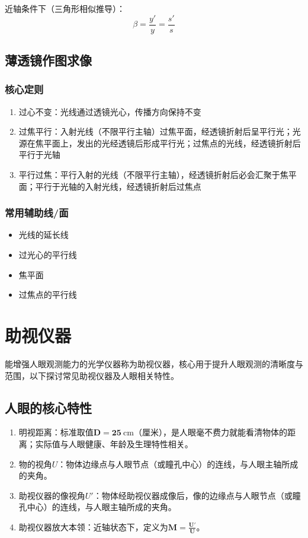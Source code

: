 \documentclass{article}
\begin{document}
	近轴条件下（三角形相似推导）：
	\[
	\beta=\frac{y'}{y}=\frac{s'}{s}
	\]
	
	\subsection{薄透镜作图求像}
	\subsubsection{核心定则}
	\begin{enumerate}[label=\arabic*., leftmargin=2em]
		\item 过心不变：光线通过透镜光心，传播方向保持不变
		\item 过焦平行：入射光线（不限平行主轴）过焦平面，经透镜折射后呈平行光；光源在焦平面上，发出的光经透镜后形成平行光；过焦点的光线，经透镜折射后平行于光轴
		\item 平行过焦：平行入射的光线（不限平行主轴），经透镜折射后必会汇聚于焦平面；平行于光轴的入射光线，经透镜折射后过焦点
	\end{enumerate}
	
	\subsubsection{常用辅助线/面}
	\begin{itemize}[leftmargin=2em, itemsep=0.3em]
		\item 光线的延长线
		\item 过光心的平行线
		\item 焦平面
		\item 过焦点的平行线
	\end{itemize}
	
	
	
	\section{助视仪器}
	能增强人眼观测能力的光学仪器称为助视仪器，核心用于提升人眼观测的清晰度与范围，以下探讨常见助视仪器及人眼相关特性。
	
	\subsection{人眼的核心特性}
	\begin{enumerate}[label=\arabic*., leftmargin=2em, itemsep=0.5em]
		\item 明视距离：标准取值$\boldsymbol{D=25\ \mathrm{cm}}$（厘米），是人眼毫不费力就能看清物体的距离；实际值与人眼健康、年龄及生理特性相关。
		\item 物的视角$U$：物体边缘点与人眼节点（或瞳孔中心）的连线，与人眼主轴所成的夹角。
		\item 助视仪器的像视角$U'$：物体经助视仪器成像后，像的边缘点与人眼节点（或瞳孔中心）的连线，与人眼主轴所成的夹角。
		\item 助视仪器放大本领：近轴状态下，定义为$\boldsymbol{M=\frac{U'}{U}}$。
	\end{enumerate}
	
\end{document}
